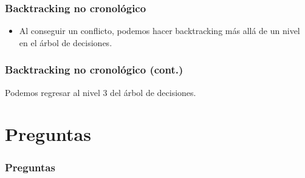 \documentclass{beamer}
\begin{document}
\frame
{
  \frametitle{Backtracking no cronológico}

   \begin{itemize}
    \item Al conseguir un conflicto, podemos hacer backtracking más allá de un nivel en el
          árbol de decisiones.
   \end{itemize}
}

\frame
{
  \frametitle{Backtracking no cronológico (cont.)}


  Podemos regresar al nivel 3 del árbol de decisiones.
}

\section{Preguntas}

\frame
{
  \frametitle{Preguntas}
}
\end{document}
